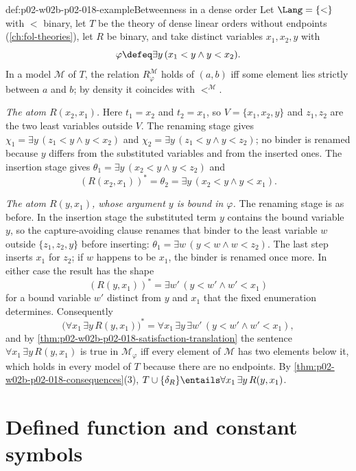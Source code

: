 \begin{hbexample}{def:p02-w02b-p02-018-example}{Betweenness in a dense order}
Let \(\Lang=\{<\}\) with \(<\) binary, let \(T\) be the theory of dense
linear orders without endpoints (\cref{ch:fol-theories}), let \(R\) be
binary, and take distinct variables \(x_1,x_2,y\) with
\[
 \varphi\defeq\exists y\,(x_1<y\land y<x_2).
\]
In a model \(\mathcal M\) of \(T\), the relation
\(R^{\mathcal M}_{\varphi}\) holds of \((a,b)\) iff some element lies
strictly between \(a\) and \(b\); by density it coincides with
\(<^{\mathcal M}\).

\emph{The atom \(R(x_2,x_1)\).}  Here \(t_1=x_2\) and \(t_2=x_1\), so
\(V=\{x_1,x_2,y\}\) and \(z_1,z_2\) are the two least variables outside
\(V\).  The renaming stage gives
\(\chi_1=\exists y\,(z_1<y\land y<x_2)\) and
\(\chi_2=\exists y\,(z_1<y\land y<z_2)\); no binder is renamed because
\(y\) differs from the substituted variables and from the inserted ones.
The insertion stage gives \(\theta_1=\exists y\,(x_2<y\land y<z_2)\) and
\[
 (R(x_2,x_1))^{*}=\theta_2=\exists y\,(x_2<y\land y<x_1).
\]

\emph{The atom \(R(y,x_1)\), whose argument \(y\) is bound in
\(\varphi\).}  The renaming stage is as before.  In the insertion stage the
substituted term \(y\) contains the bound variable \(y\), so the
capture-avoiding clause renames that binder to the least variable \(w\)
outside \(\{z_1,z_2,y\}\) before inserting:
\(\theta_1=\exists w\,(y<w\land w<z_2)\).  The last step inserts \(x_1\)
for \(z_2\); if \(w\) happens to be \(x_1\), the binder is renamed once
more.  In either case the result has the shape
\[
 (R(y,x_1))^{*}=\exists w'\,(y<w'\land w'<x_1)
\]
for a bound variable \(w'\) distinct from \(y\) and \(x_1\) that the fixed
enumeration determines.  Consequently
\[
 \bigl(\forall x_1\,\exists y\,R(y,x_1)\bigr)^{*}
 =\forall x_1\,\exists y\,\exists w'\,(y<w'\land w'<x_1),
\]
and by \cref{thm:p02-w02b-p02-018-satisfaction-translation} the sentence
\(\forall x_1\,\exists y\,R(y,x_1)\) is true in \(\mathcal M_{\varphi}\)
iff every element of \(\mathcal M\) has two elements below it, which holds
in every model of \(T\) because there are no endpoints.  By
\cref{thm:p02-w02b-p02-018-consequences}(3),
\(T\cup\{\delta_R\}\entails\forall x_1\,\exists y\,R(y,x_1)\).
\end{hbexample}

\section{Defined function and constant symbols}
\label{sec:p02-w02b-p02-018-function-symbols}

